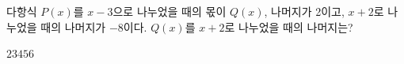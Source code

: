 다항식 $P(x)$를 $x-3$으로 나누었을 때의 몫이 $Q(x)$, 나머지가 2이고, $x+2$로 나누었을 때의 나머지가 $-8$이다. $Q(x)$를 $x+2$로 나누었을 때의 나머지는?
\begin{choices32}{$2$}{$3$}{$4$}{$5$}{$6$}\end{choices32}
